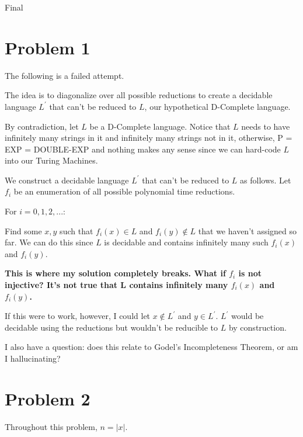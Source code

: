 \documentclass[usletter]{article}
\begin{document}
           {Final} 
           

\section*{Problem 1}

The following is a failed attempt.

The idea is to diagonalize over all possible reductions
to create a decidable language $L^{\prime}$ that can't be reduced to $L$, our hypothetical
D-Complete language.

By contradiction, let $L$ be a D-Complete language. Notice that $L$ needs to have infinitely many
strings in it and infinitely many strings not in it, otherwise, P = EXP = DOUBLE-EXP and nothing
makes any sense since we can hard-code $L$ into our Turing Machines.

We construct a decidable language
$L^{\prime}$ that can't be reduced to $L$ as follows. Let $f_{i}$ be an enumeration
of all possible polynomial time reductions.

For $i = 0,1,2,...$:

Find some $x,y$ such that $f_{i}(x) \in L$ and $f_{i}(y) \notin L$ that we haven't assigned so far.
We can do this since $L$ is decidable and contains infinitely many such $f_{i}(x)$ and $f_{i}(y)$.

\textbf{This is where my solution completely breaks. What if $f_{i}$ is not injective? It's not true
that L contains infinitely many $f_{i}(x)$ and $f_{i}(y)$.}

If this were to work, however, I could let $x \notin L^{\prime}$ and $y \in L^{\prime}$. $L^{\prime}$
would be decidable using the reductions but wouldn't be reducible to $L$ by construction.

I also have a question: does this relate to Godel's Incompleteness Theorem,
or am I hallucinating?

\newpage

\section*{Problem 2}

Throughout this problem, $n = \lvert x \rvert$.
\end{document}
